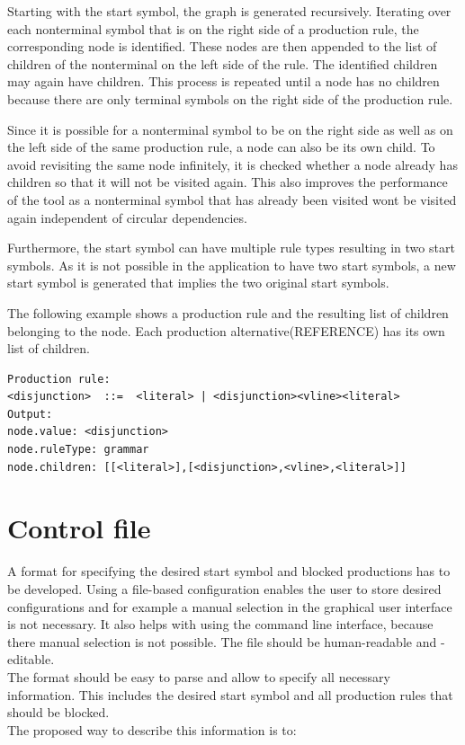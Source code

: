 Starting with the start symbol, the graph is generated recursively. Iterating over each nonterminal symbol that is on the right side of a production rule, the corresponding node is identified. These nodes are then appended to the list of children of the nonterminal on the left side of the rule. The identified children may again have children. This process is repeated until a node has no children because there are only terminal symbols on the right side of the production rule.

Since it is possible for a nonterminal symbol to be on the right side as well as on the left side of the same production rule, a node can also be its own child. To avoid revisiting the same node infinitely, it is checked whether a node already has children so that it will not be visited again. This also improves the performance of the tool as a nonterminal symbol that has already been visited wont be visited again independent of circular dependencies.

Furthermore, the start symbol can have multiple rule types resulting in two start symbols. As it is not possible in the application to have two start symbols, a new start symbol is generated that implies the two original start symbols. 

The following example shows a production rule and the resulting list of children belonging to the node. Each production alternative(REFERENCE) has its own list of children. %
\begin{verbatim}
Production rule: 
<disjunction>  ::=  <literal> | <disjunction><vline><literal> 
Output:
node.value: <disjunction>
node.ruleType: grammar
node.children: [[<literal>],[<disjunction>,<vline>,<literal>]]
\end{verbatim}

\section{Control file}\label{sec:ConceptControlFile}
A format for specifying the desired start symbol and blocked productions has to be developed.
Using a file-based configuration enables the user to store desired configurations and for example a manual selection in the graphical user interface is not necessary.
It also helps with using the command line interface, because there manual selection is not possible.
The file should be human-readable and -editable.\\
The format should be easy to parse and allow to specify all necessary information.
This includes the desired start symbol and all production rules that should be blocked.\\
The proposed way to describe this information is to:

